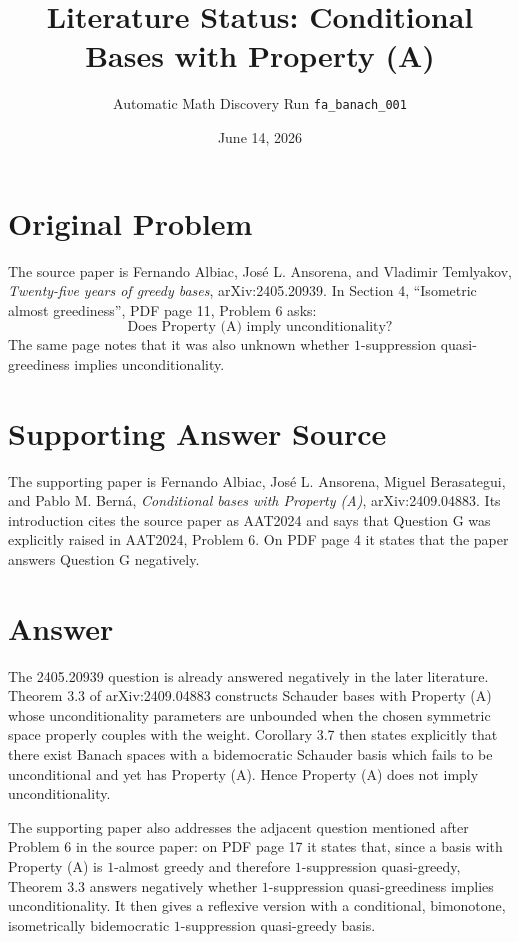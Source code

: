 \documentclass[11pt]{article}
\title{Literature Status: Conditional Bases with Property (A)}
\author{Automatic Math Discovery Run \texttt{fa\_banach\_001}}
\date{June 14, 2026}
\begin{document}
\maketitle

\section*{Original Problem}

The source paper is Fernando Albiac, Jos\'e L. Ansorena, and Vladimir
Temlyakov, \emph{Twenty-five years of greedy bases}, arXiv:2405.20939.
In Section 4, ``Isometric almost greediness'', PDF page 11, Problem 6 asks:
\[
\text{Does Property (A) imply unconditionality?}
\]
The same page notes that it was also unknown whether
\(1\)-suppression quasi-greediness implies unconditionality.

\section*{Supporting Answer Source}

The supporting paper is Fernando Albiac, Jos\'e L. Ansorena, Miguel
Berasategui, and Pablo M. Bern\'a, \emph{Conditional bases with Property (A)},
arXiv:2409.04883. Its introduction cites the source paper as AAT2024 and says
that Question G was explicitly raised in AAT2024, Problem 6. On PDF page 4 it
states that the paper answers Question G negatively.

\section*{Answer}

The 2405.20939 question is already answered negatively in the later literature.
Theorem 3.3 of arXiv:2409.04883 constructs Schauder bases with Property (A)
whose unconditionality parameters are unbounded when the chosen symmetric
space properly couples with the weight. Corollary 3.7 then states explicitly
that there exist Banach spaces with a bidemocratic Schauder basis which fails
to be unconditional and yet has Property (A). Hence Property (A) does not imply
unconditionality.

The supporting paper also addresses the adjacent question mentioned after
Problem 6 in the source paper: on PDF page 17 it states that, since a basis
with Property (A) is \(1\)-almost greedy and therefore
\(1\)-suppression quasi-greedy, Theorem 3.3 answers negatively whether
\(1\)-suppression quasi-greediness implies unconditionality. It then gives a
reflexive version with a conditional, bimonotone, isometrically bidemocratic
\(1\)-suppression quasi-greedy basis.
\end{document}
